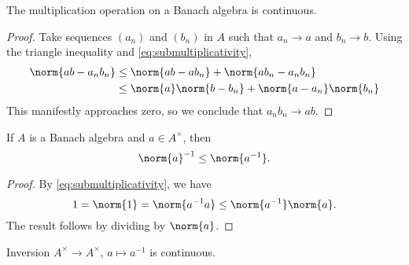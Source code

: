 \begin{proposition}
The multiplication operation on a Banach algebra is continuous.
\end{proposition}

\begin{proof}
Take sequences $(a_n)$ and $(b_n)$ in $A$ such that $a_n \rightarrow a$ and $b_n \rightarrow b$. Using the triangle inequality and \eqref{eq:submultiplicativity},
\begin{equation}
\begin{aligned}
\norm{ab - a_n b_n} &\leq \norm{ab - ab_n} + \norm{ab_n - a_nb_n}\\
&\leq \norm{a} \norm{b - b_n} + \norm{a - a_n} \norm{b_n}
\end{aligned}
\end{equation}
This manifestly approaches zero, so we conclude that $a_nb_n \rightarrow ab$.
\end{proof}



\begin{proposition}
If $A$ is a Banach algebra and $a \in A^\times$, then
\begin{equation}
\norm{a}^{-1} \leq \norm{a^{-1}}.
\end{equation}
\end{proposition}

\begin{proof}
By \eqref{eq:submultiplicativity}, we have
\begin{equation}
1 = \norm{1} =\norm{a^{-1}a} \leq \norm{a^{-1}}\norm{a}.
\end{equation}
The result follows by dividing by $\norm{a}$.
\end{proof}



\begin{proposition}
Inversion $A^\times \rightarrow A^\times$, $a \mapsto a^{-1}$ is continuous.
\end{proposition}

